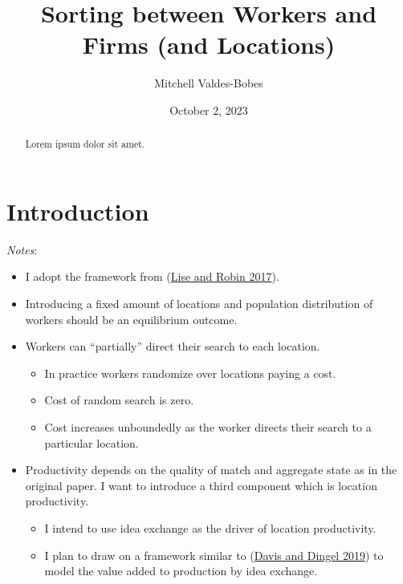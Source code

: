 \documentclass[
  letterpaper,
  DIV=11,
  numbers=noendperiod]{scrreprt}
\title{Sorting between Workers and Firms (and Locations)}
\author{Mitchell Valdes-Bobes}
\date{October 2, 2023}
\providecommand{\tightlist}{%
  \setlength{\itemsep}{0pt}\setlength{\parskip}{0pt}}\usepackage{longtable,booktabs,array}
\renewcommand*\contentsname{Table of contents}
\newcommand\contentsname{Table of contents}
\begin{document}
\maketitle
\begin{abstract}
Lorem ipsum dolor sit amet.
\end{abstract}
\ifdefined\Shaded\renewenvironment{Shaded}{\begin{tcolorbox}[borderline west={3pt}{0pt}{shadecolor}, interior hidden, boxrule=0pt, breakable, sharp corners, enhanced, frame hidden]}{\end{tcolorbox}}\fi

\renewcommand*\contentsname{Table of contents}
{
\hypersetup{linkcolor=}
\setcounter{tocdepth}{2}
\tableofcontents
}

\hypertarget{introduction}{%
\chapter{Introduction}\label{introduction}}

\emph{Notes}:

\begin{itemize}
\tightlist
\item
  I adopt the framework from
  (\protect\hyperlink{ref-liseMacrodynamicsSortingWorkers2017}{Lise and
  Robin 2017}).
\item
  Introducing a fixed amount of locations and population distribution of
  workers should be an equilibrium outcome.
\item
  Workers can ``partially'' direct their search to each location.

  \begin{itemize}
  \tightlist
  \item
    In practice workers randomize over locations paying a cost.
  \item
    Cost of random search is zero.
  \item
    Cost increases unboundedly as the worker directs their search to a
    particular location.
  \end{itemize}
\item
  Productivity depends on the quality of match and aggregate state as in
  the original paper. I want to introduce a third component which is
  location productivity.

  \begin{itemize}
  \tightlist
  \item
    I intend to use idea exchange as the driver of location
    productivity.
  \item
    I plan to draw on a framework similar to
    (\protect\hyperlink{ref-davisSpatialKnowledgeEconomy2019}{Davis and
    Dingel 2019}) to model the value added to production by idea
    exchange.
  \end{itemize}
\end{itemize}
\end{document}
